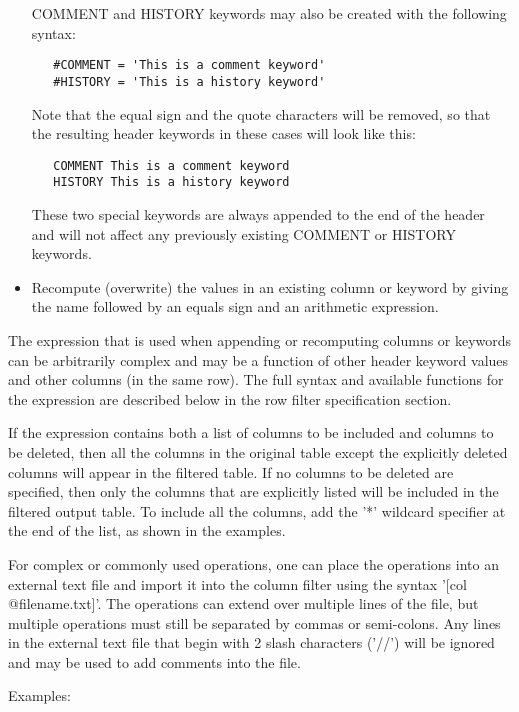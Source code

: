 \documentclass[11pt]{book}
\begin{document}
\begin{itemize}
COMMENT and HISTORY keywords may also be created with the following syntax:

\begin{verbatim}
   #COMMENT = 'This is a comment keyword'
   #HISTORY = 'This is a history keyword'
\end{verbatim}
Note that the equal sign and the quote characters will be removed, so
that the resulting header keywords in these cases will look like this:

\begin{verbatim}
   COMMENT This is a comment keyword
   HISTORY This is a history keyword
\end{verbatim}
These two special keywords are always appended to the end of the header
and will not affect any previously existing COMMENT or HISTORY keywords.

\item
Recompute (overwrite) the values in an existing column or keyword by
giving the name followed by an equals sign and an arithmetic
expression.
\end{itemize}

The expression that is used when appending or recomputing columns or
keywords can be arbitrarily complex and may be a function of other
header keyword values and other columns (in the same row).  The full
syntax and available functions for the expression are described below
in the row filter specification section.

If the expression contains both a list of columns to be included and
columns to be deleted, then all the columns in the original table
except the explicitly deleted columns will appear in the filtered
table.  If no columns to be deleted are specified, then only the
columns that are explicitly listed will be included in the filtered
output table.  To include all the columns, add the '*' wildcard
specifier at the end of the list, as shown in the examples.

For  complex  or commonly used operations,  one  can  place the
operations into an external text  file and import it  into the  column
filter using  the syntax '[col @filename.txt]'.   The operations can
extend over multiple lines of the  file, but multiple operations must
still be separated by commas or semi-colons.   Any lines in the external text file
that begin with 2 slash characters ('//') will be ignored and may be
used to add comments into the file.

Examples:
\end{document}
